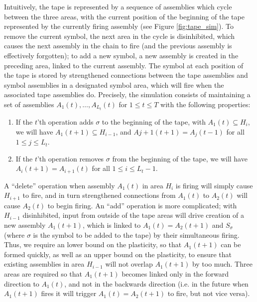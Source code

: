 \documentclass[12pt,nosubfloats]{alt2024} %
\newcommand{\1}{\mathbbm{1}}
\begin{document}
Intuitively, the tape is represented by a sequence of assemblies which cycle between the three areas, with the current position of the beginning of the tape represented by the currently firing assembly (see Figure \ref{fig:tape_sim}). To remove the current symbol, the next area in the cycle is disinhibited, which causes the next assembly in the chain to fire (and the previous assembly is effectively forgotten); to add a new symbol, a new assembly is created in the preceding area, linked to the current assembly. The symbol at each position of the tape is stored by strengthened connections between the tape assemblies and symbol assemblies in a designated symbol area, which will fire when the associated tape assemblies do. Precisely, the simulation consists of maintaining a set of assemblies $A_1(t), \ldots, A_{L_t}(t)$ for $1 \le t \le T$ with the following properties:
\begin{enumerate}[label=(\roman*)]
    \item If the $t$'th operation adds $\sigma$ to the beginning of the tape, with $A_1(t) \subseteq H_i$, we will have $A_{1}(t+1) \subseteq H_{i-1}$, and $A{j+1}(t+1) = A_j(t-1)$ for all $1 \le j \le L_t$.
    \item If the $t$'th operation removes $\sigma$ from the beginning of the tape, we will have $A_i(t+1) = A_{i+1}(t)$ for all $1 \le i \le L_t-1$.
\end{enumerate}

A ``delete'' operation when assembly $A_1(t)$ in area $H_i$ is firing will simply cause $H_{i+1}$ to fire, and in turn strengthened connections from $A_1(t)$ to $A_2(t)$ will cause $A_2(t)$ to begin firing. An ``add'' operation is more complicated; with $H_{i-1}$ disinhibited, input from outside of the tape areas will drive creation of a new assembly $A_1(t+1)$, which is linked to $A_1(t) = A_2(t+1)$ and $S_\sigma$ (where $\sigma$ is the symbol to be added to the tape) by their simultaneous firing. Thus, we require an lower bound on the plasticity, so that $A_1(t+1)$ can be formed quickly, as well as an upper bound on the plasticity, to ensure that existing assemblies in area $H_{i-1}$ will not overlap $A_1(t+1)$ by too much. Three areas are required so that $A_1(t+1)$ becomes linked only in the forward direction to $A_1(t)$, and not in the backwards direction (i.e. in the future when $A_1(t+1)$ fires it will trigger $A_1(t) = A_2(t+1)$ to fire, but not vice versa).
\end{document}
